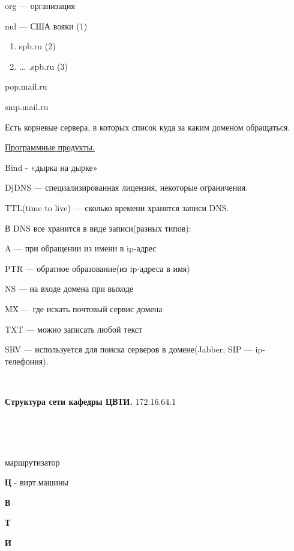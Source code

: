 \par 
org — организация 

\par 
nul — США вояки     (1)
\begin{enumerate}
	\item \par 
	spb.ru  (2)
	\item \par 
	... .spb.ru (3)
\end{enumerate}
\par 
pop.mail.ru
\par 
smp.mail.ru
\par 
Есть корневые сервера, в которых
список куда за каким доменом обращаться.
\par 
\underline{Программные продукты.}
\par 
Bind - «дырка на дырке»
\par 
DjDNS — специализированная лицензия,
некоторые ограничения.
\par 
TTL(time to live) — сколько времени хранятся
записи DNS.
\par 
В DNS все хранится в виде записи(разных
типов):
\par 
A — при обращении из имени в ip-адрес
\par 
PTR — обратное образование(из ip-адреса
в имя)
\par 
NS — на входе домена при выходе
\par 
MX — где искать почтовый сервис домена
\par 
TXT — можно записать любой текст
\par 
SRV — используется для поиска серверов
в домене(Jabber, SIP — ip-телефония).
\par 
\\

\par \textbf{Структура
сети кафедры ЦВТИ.          }172.16.64.1
\par 
\\

\par 
\\

\par 

                                                                
маршрутизатор
\par 
    \textbf{Ц}			
      - вирт.машины
\par 
    \textbf{В}				
\par 
    \textbf{Т}
\par 
    \textbf{И}
\par 
\\

